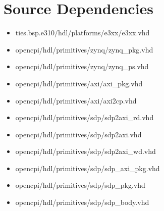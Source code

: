 \documentclass{article}
\begin{document}
\newpage
\section*{Source Dependencies}
\begin{itemize}
	\item
ties.bsp.e310/hdl/platforms/e3xx/e3xx.vhd
	\item
opencpi/hdl/primitives/zynq/zynq\_pkg.vhd
	\item
opencpi/hdl/primitives/zynq/zynq\_ps.vhd
	\item
opencpi/hdl/primitives/axi/axi\_pkg.vhd
	\item
opencpi/hdl/primitives/axi/axi2cp.vhd
	\item
opencpi/hdl/primitives/sdp/sdp2axi\_rd.vhd
	\item
opencpi/hdl/primitives/sdp/sdp2axi.vhd
	\item
opencpi/hdl/primitives/sdp/sdp2axi\_wd.vhd
	\item
opencpi/hdl/primitives/sdp/sdp\_axi\_pkg.vhd
	\item
opencpi/hdl/primitives/sdp/sdp\_pkg.vhd
	\item
opencpi/hdl/primitives/sdp/sdp\_body.vhd
\end{itemize}
\end{document}
